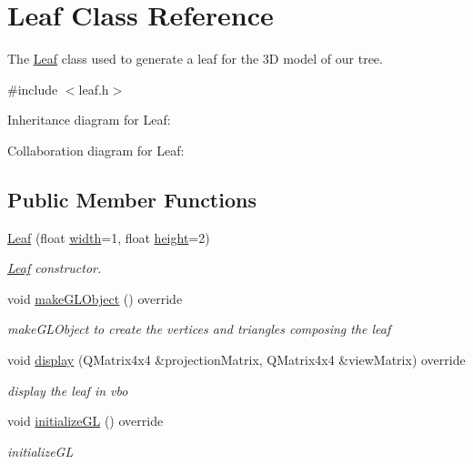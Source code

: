 \hypertarget{classLeaf}{}\section{Leaf Class Reference}
\label{classLeaf}


The \hyperlink{classLeaf}{Leaf} class used to generate a leaf for the 3D model of our tree.  




{\ttfamily \#include $<$leaf.\+h$>$}



Inheritance diagram for Leaf\+:


Collaboration diagram for Leaf\+:
\subsection*{Public Member Functions}
\begin{DoxyCompactItemize}
\item 
\hyperlink{classLeaf_a5549ab046aab3d58145ffaf99fd5579c}{Leaf} (float \hyperlink{classLeaf_ac3b292e68ddbf60ea185dab921fe4c68}{width}=1, float \hyperlink{classLeaf_a4ae312ed546e868d9e7e72f6a9307cb4}{height}=2)
\begin{DoxyCompactList}\small\item\em \hyperlink{classLeaf}{Leaf} constructor. \end{DoxyCompactList}\item 
void \hyperlink{classLeaf_ac3d35271ec658ca78ca83e5bf81c20d1}{make\+G\+L\+Object} () override
\begin{DoxyCompactList}\small\item\em make\+G\+L\+Object to create the vertices and triangles composing the leaf \end{DoxyCompactList}\item 
void \hyperlink{classLeaf_a8eb757a10f15e34dd72522ae463c760c}{display} (Q\+Matrix4x4 \&projection\+Matrix, Q\+Matrix4x4 \&view\+Matrix) override
\begin{DoxyCompactList}\small\item\em display the leaf in vbo \end{DoxyCompactList}\item 
void \hyperlink{classLeaf_a5c0c2ea2fdb32a5b2f8c91982d987f65}{initialize\+GL} () override
\begin{DoxyCompactList}\small\item\em initialize\+GL \end{DoxyCompactList}\end{DoxyCompactItemize}
